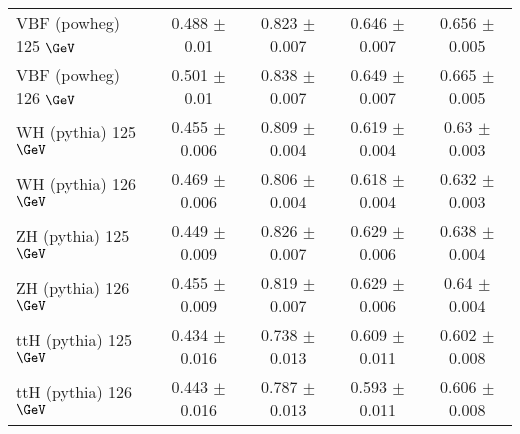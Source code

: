 \begin{sidewaystable}[!h!tb]
\begin{center}
\begin{tabular}{|l|c|c|c|c|}
VBF ({\sc powheg}) 125 $\GeV$  & 0.488  $\pm$  0.01  & 0.823  $\pm$  0.007  & 0.646  $\pm$  0.007  & 0.656  $\pm$  0.005  \\
VBF ({\sc powheg}) 126 $\GeV$  & 0.501  $\pm$  0.01  & 0.838  $\pm$  0.007  & 0.649  $\pm$  0.007  & 0.665  $\pm$  0.005  \\
WH ({\sc pythia}) 125 $\GeV$  & 0.455  $\pm$  0.006  & 0.809  $\pm$  0.004  & 0.619  $\pm$  0.004  & 0.63  $\pm$  0.003  \\
WH ({\sc pythia}) 126 $\GeV$  & 0.469  $\pm$  0.006  & 0.806  $\pm$  0.004  & 0.618  $\pm$  0.004  & 0.632  $\pm$  0.003  \\
ZH ({\sc pythia}) 125 $\GeV$  & 0.449  $\pm$  0.009  & 0.826  $\pm$  0.007  & 0.629  $\pm$  0.006  & 0.638  $\pm$  0.004  \\
ZH ({\sc pythia}) 126 $\GeV$  & 0.455  $\pm$  0.009  & 0.819  $\pm$  0.007  & 0.629  $\pm$  0.006  & 0.64  $\pm$  0.004  \\
ttH ({\sc pythia}) 125 $\GeV$  & 0.434  $\pm$  0.016  & 0.738  $\pm$  0.013  & 0.609  $\pm$  0.011  & 0.602  $\pm$  0.008  \\
ttH ({\sc pythia}) 126 $\GeV$  & 0.443  $\pm$  0.016  & 0.787  $\pm$  0.013  & 0.593  $\pm$  0.011  & 0.606  $\pm$  0.008  \\
\hline
\end{tabular}
\normalsize
\end{center}
\end{sidewaystable}

